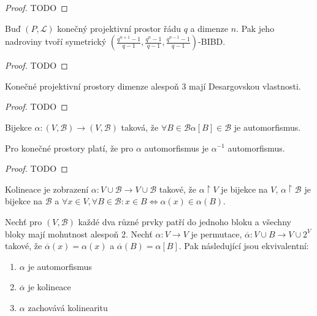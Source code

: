 \begin{proof}
    TODO
\end{proof}
\begin{theorem}
    Buď $(P,\mathcal{L})$ konečný projektivní prostor řádu $q$ a dimenze $n$.
    Pak jeho nadroviny tvoří symetrický $(\frac{q^{n+1}-1}{q-1},\frac{q^n-1}{q-1},\frac{q^{n-1}-1}{q-1})$-BIBD.
\end{theorem}
\begin{proof}
    TODO
\end{proof}
\begin{theorem}
    Konečné projektivní prostory dimenze alespoň 3 mají Desargovskou vlastnosti.
\end{theorem}
\begin{proof}
    TODO
\end{proof}
\begin{definition}[Automorfismus]
    Bijekce $\alpha: (V,\mathcal{B})\rightarrow (V,\mathcal{B})$ taková, že $\forall B\in \mathcal{B} \alpha[B]\in\mathcal{B}$ je automorfismus.
\end{definition}
\begin{note}
    Pro konečné prostory platí, že pro $\alpha$ automorfismus je $\alpha^{-1}$ automorfismus.
\end{note}
\begin{proof}
    TODO
\end{proof}
\begin{definition}[Kolineace]
    Kolineace je zobrazení $\alpha: V\cup \mathcal{B}\rightarrow V\cup \mathcal{B}$ takové, že $\alpha\upharpoonright V$ je bijekce na $V$, $\alpha\upharpoonright \mathcal{B}$ je bijekce na $\mathcal{B}$ a $\forall x\in V, \forall B\in\mathcal{B}: x\in B\Leftrightarrow \alpha(x)\in\alpha(B)$.
\end{definition}
\begin{theorem}
    Nechť pro $(V,\mathcal{B})$ každé dva různé prvky patří do jednoho bloku a všechny bloky mají mohutnost alespoň 2.
    Nechť $\alpha: V\rightarrow V$ je permutace, $\overline{\alpha}: V\cup B\rightarrow V\cup 2^V$ takové, že $\overline{\alpha}(x)=\alpha(x)$ a $\overline{\alpha}(B)=\alpha[B]$.
    Pak následující jsou ekvivalentní:
    \begin{enumerate}
        \item $\alpha$ je automorfismus
        \item $\overline{\alpha}$ je kolineace
        \item $\alpha$ zachovává kolinearitu
    \end{enumerate}
\end{theorem}
